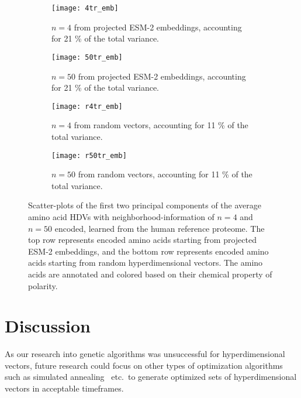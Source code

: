 \begin{figure}[H]
    \centering
    \begin{subfigure}[b]{0.45\textwidth}
        \texttt{[image: 4tr\_emb]}
        \caption{$n = 4$ from projected ESM-2 embeddings, accounting for 21 \% of the total variance.}
        \label{fig:AAtr4}
    \end{subfigure}
    \hfill
    \begin{subfigure}[b]{0.45\textwidth}
        \texttt{[image: 50tr\_emb]}
        \caption{$n = 50$ from projected ESM-2 embeddings, accounting for 21 \% of the total variance.}
        \label{fig:AAtr50}
    \end{subfigure}
    \vspace{10pt} %
    \begin{subfigure}[b]{0.45\textwidth}
        \texttt{[image: r4tr\_emb]}
        \caption{$n = 4$ from random vectors, accounting for 11 \% of the total variance.}
        \label{fig:AArtr4}
    \end{subfigure}
    \hfill
    \begin{subfigure}[b]{0.45\textwidth}
        \texttt{[image: r50tr\_emb]}
        \caption{$n = 50$ from random vectors, accounting for 11 \% of the total variance.}
        \label{fig:AArtr50}
    \end{subfigure}
    \caption{Scatter-plots of the first two principal components of the average amino acid HDVs with neighborhood-information of $n = 4$ and $n = 50$ encoded, learned from the human reference proteome. The top row represents encoded amino acids starting from projected ESM-2 embeddings, and the bottom row represents encoded amino acids starting from random hyperdimensional vectors. The amino acids are annotated and colored based on their chemical property of polarity.}\label{fig:bigfig}
\end{figure}

\section{Discussion}\label{sec:dis3}
As our research into genetic algorithms was unsuccessful for hyperdimensional vectors, future research could focus on other types of optimization algorithms such as simulated annealing~\cite{} etc.\ to generate optimized sets of hyperdimensional vectors in acceptable timeframes.

